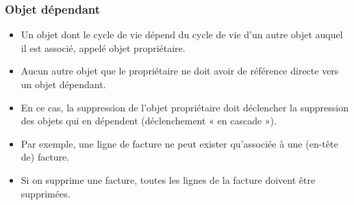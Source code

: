 \documentclass[xcolor=pdftex,x11names,table]{beamer}
\begin{document}
		\begin{frame}
    \frametitle{Objet dépendant}
		  \begin{itemize}
		  	\item Un objet dont le cycle de vie dépend du cycle de vie d’un autre objet auquel il est associé, appelé objet propriétaire.
				\item Aucun autre objet que le propriétaire ne doit avoir de référence directe vers un objet dépendant.
				\item En ce cas, la suppression de l’objet propriétaire doit déclencher la suppression des objets qui en dépendent (déclenchement « en cascade »).
				\item Par exemple, une ligne de facture ne peut exister qu’associée à une (en-tête de) facture.
				\item Si on supprime une facture, toutes les lignes de la facture doivent être supprimées.
		  \end{itemize}	
   	\end{frame}
\end{document}
